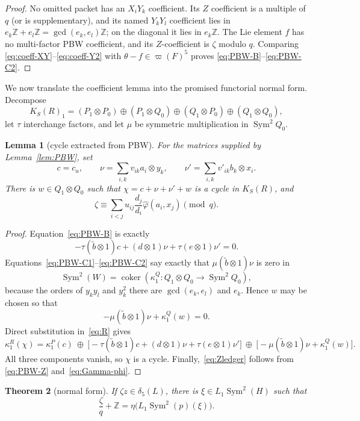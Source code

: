 \documentclass[11pt]{amsart}
\newtheorem{theorem}{Theorem}[section]
\newtheorem{lemma}[theorem]{Lemma}
\theoremstyle{remark}
\newcommand{\Z}{\mathbb Z}
\newcommand{\Sym}{\operatorname{Sym}}
\newcommand{\dlt}{\delta}
\newcommand{\aug}{\varpi}
\begin{document}
\begin{proof}
No omitted packet has an $X_iY_k$ coefficient.  Its $Z$ coefficient
is a multiple of $q$ (or is supplementary), and its named
$Y_kY_l$ coefficient lies in
$e_k\Z+e_l\Z=\gcd(e_k,e_l)\Z$; on the diagonal it lies in
$e_k\Z$.  The Lie element $f$ has no multi-factor PBW coefficient,
and its $Z$-coefficient is $\zeta$ modulo $q$.  Comparing
\eqref{eq:coeff-XY}--\eqref{eq:coeff-Y2} with
$\theta-f\in\aug(F)^5$ proves
\eqref{eq:PBW-B}--\eqref{eq:PBW-C2}.
\end{proof}

We now translate the coefficient lemma into the promised functorial
normal form.  Decompose
\[
 K_S(R)_1=(P_1\otimes P_0)\oplus(P_1\otimes Q_0)
 \oplus(Q_1\otimes P_0)\oplus(Q_1\otimes Q_0),
\]
let $\tau$ interchange factors, and let $\mu$ be symmetric
multiplication in $\Sym^2Q_0$.

\begin{lemma}[cycle extracted from PBW]\label{lem:PBW-cycle}
For the matrices supplied by Lemma~\ref{lem:PBW}, set
\[
 c=c_u,\qquad
 \nu=\sum_{i,k}v_{ik}a_i\otimes y_k,\qquad
 \nu'=\sum_{i,k}v'_{ik}b_k\otimes x_i.
\]
There is $w\in Q_1\otimes Q_0$ such that
$\chi=c+\nu+\nu'+w$ is a cycle in $K_S(R)$, and
\begin{equation}\label{eq:Zledger}
 \zeta\equiv
 \sum_{i<j}u_{ij}\frac{d_j}{d_i}
       \widehat\varphi(a_i,x_j)\pmod q.
\end{equation}
\end{lemma}

\begin{proof}
Equation~\eqref{eq:PBW-B} is exactly
\[
 -\tau(\widetilde b\otimes1)c+(d\otimes1)\nu
       +\tau(e\otimes1)\nu'=0.
\]
Equations~\eqref{eq:PBW-C1}--\eqref{eq:PBW-C2} say exactly that
$\mu(\widetilde b\otimes1)\nu$ is zero in
\[
 \Sym^2(W)=\operatorname{coker}
   (\kappa_1^Q:Q_1\otimes Q_0\to\Sym^2Q_0),
\]
because the orders of $y_ky_l$ and $y_k^2$ there are
$\gcd(e_k,e_l)$ and $e_k$.  Hence $w$ may be chosen so that
\[
 -\mu(\widetilde b\otimes1)\nu+\kappa_1^Q(w)=0.
\]
Direct substitution in~\eqref{eq:R} gives
\[
 \kappa_1^R(\chi)=
 \kappa_1^P(c)\ \oplus\
 \bigl[-\tau(\widetilde b\otimes1)c+(d\otimes1)\nu
          +\tau(e\otimes1)\nu'\bigr]\ \oplus\
 \bigl[-\mu(\widetilde b\otimes1)\nu+\kappa_1^Q(w)\bigr].
\]
All three components vanish, so $\chi$ is a cycle.
Finally,~\eqref{eq:Zledger} follows from
\eqref{eq:PBW-Z} and~\eqref{eq:Gamma-phi}.
\end{proof}

\begin{theorem}[normal form]\label{thm:normal}
If $\zeta z\in\dlt_5(L)$, there is
$\xi\in L_1\Sym^2(H)$ such that
\begin{equation}\label{eq:normal}
 \frac{\zeta}{q}+\Z
 =\eta\bigl(L_1\Sym^2(p)(\xi)\bigr).
\end{equation}
\end{theorem}
\end{document}
